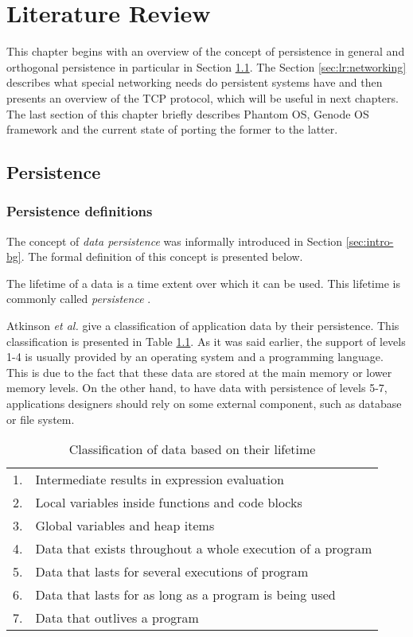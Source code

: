\chapter{Literature Review}
\label{chap:lr}

This chapter begins with an overview of the concept of persistence in general
and orthogonal persistence in particular in Section \ref{sec:lr:persistence}.
The Section \ref{sec:lr:networking} describes what special networking needs
do persistent systems have and then presents an overview of the TCP protocol,
which will be useful in next chapters. The last section of this chapter
briefly describes Phantom OS, Genode OS framework and the current state of
porting the former to the latter.

\section{Persistence}
\label{sec:lr:persistence}
\subsection{Persistence definitions}

The concept of \textit{data persistence} was informally introduced in Section
\ref{sec:intro-bg}. The formal definition of this concept is presented below.
\begin{definition}
The lifetime of a data is a time extent over which it can be used. This
lifetime is commonly called \textit{persistence} \cite{atkinson1983ps}. 
\end{definition}

Atkinson \textit{et al.} \cite{atkinson1995orthogonally,atkinson1983ps} give a
classification of application data by their persistence. This classification is
presented in Table \ref{tab:data_lifetimes}. As it was said earlier, the
support of levels 1-4 is usually provided by an operating system and a
programming language. This is due to the fact that these data are stored at the
main memory or lower memory levels. On the other hand, to have data with
persistence of levels 5-7, applications designers should rely on some external
component, such as database or file system. 

\begin{longtable}{cl}
\caption[Classification of data based on their lifetime]{Classification of data
based on their lifetime} 
\label{tab:data_lifetimes} \\
\hline
1. & Intermediate results in expression evaluation \\
2. & Local variables inside functions and code blocks \\
3. & Global variables and heap items \\
4. & Data that exists throughout a whole execution of a program \\
5. & Data that lasts for several executions of program \\
6. & Data that lasts for as long as a program is being used \\
7. & Data that outlives a program \\
\hline
\end{longtable}

